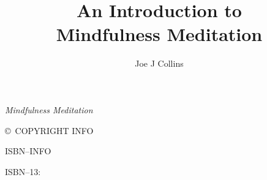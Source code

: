 \usepackage[paperwidth=148mm, paperheight=210mm, bindingoffset=.75in]{geometry}
\usepackage[latin1]{inputenc}

\renewcommand{\familydefault}{cmss}
\newcommand{\smaller}{\small}
\raggedright 



\makeatletter
\def\maketitle{%
  \null
  \thispagestyle{empty}%
  \vfill
  \begin{center}\leavevmode
    \normalfont
    {\LARGE\raggedleft \@author\par}%
    \hrulefill\par
    {\huge\raggedright \@title\par}%
    \vskip 1cm
  \end{center}%
  \vfill
  \null
  \cleardoublepage
  }
\makeatother
\author{Joe J Collins}
\title{An Introduction to \\Mindfulness Meditation}
\date{}



\let\cleardoublepage\clearpage


\maketitle


\frontmatter

\null\vfill

\begin{flushleft}
\textit{Mindfulness Meditation}

\copyright\ COPYRIGHT INFO

ISBN--INFO

ISBN--13: 
\bigskip

\end{flushleft}
\let\cleardoublepage\clearpage

\mainmatter
\sloppy